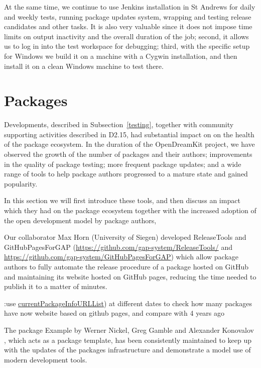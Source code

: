 \documentclass{deliverablereport}
\begin{document}
At the same time, we continue to use Jenkins installation in St Andrews 
for daily and weekly tests, running package updates system, wrapping and
testing release candidates and other tasks. It is also very valuable since 
it does not impose time limits on output inactivity and the overall duration
of the job; second, it allows us to log in into the test workspace for
debugging; third, with the specific \GAP setup for Windows we build it on a
machine with a Cygwin installation, and then install it on a clean Windows
machine to test there. 

\section{\GAP Packages}\label{packages}

Developments, described in Subsection~\ref{testing}, together with community
supporting activities described in D2.15,  had substantial
impact on on the health of the package ecosystem. In the duration of the OpenDreamKit
project, we have observed the growth of the number of \GAP packages and their 
authors; improvements in the quality of package testing; more frequent
package updates; and a wide range of tools to help package authors progressed
to a mature state and gained popularity.

In this section we will first introduce these tools, and then discuss an
impact which they had on the package ecosystem together with the increased
adoption of the open development model by package authors,

Our collaborator Max Horn (University of Siegen) developed {\sf ReleaseTools}
and {\sf GitHubPagesForGAP} (\url{https://github.com/gap-system/ReleaseTools/}
and \url{https://github.com/gap-system/GitHubPagesForGAP}) which allow package
authors to fully automate the release procedure of a \GAP package hosted on GitHub
and maintaining its website hosted on GitHub pages,
reducing the time needed to publish it to a matter of minutes.

\TODO:{use \url{currentPackageInfoURLList}) at different dates to
check how many packages have now website based on github pages,
and compare with 4 years ago}

The \GAP package {\sf Example} by Werner Nickel, Greg Gamble and
Alexander Konovalov \cite{example}, which acts as a package template,
has been consistently maintained to keep up with the updates
of the packages infrastructure and demonstrate a model use of modern
development tools.
\end{document}
